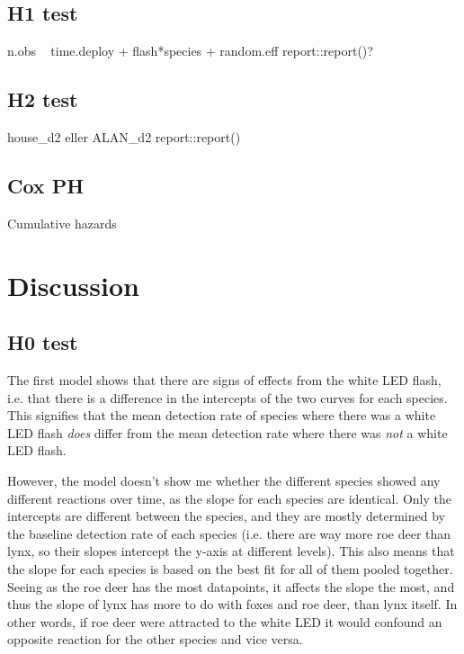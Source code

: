 \subsection{H1 test}
n.obs ~ time.deploy + flash*species + random.eff
report::report()?


\subsection{H2 test}
house_d2 eller ALAN_d2
report::report()




\subsection{Cox PH}
Cumulative hazards




\section{Discussion}
\subsection{H0 test}

The first model shows that there are signs of effects from the white LED flash, i.e. that there is a difference in the intercepts of the two curves for each species.
This signifies that the mean detection rate of species where there was a white LED flash \emph{does} differ from the mean detection rate where there was \emph{not} a white LED flash.

However, the model doesn't show me whether the different species showed any different reactions over time, as the slope for each species are identical. Only the intercepts are different between the species, and they are mostly determined by the baseline detection rate of each species (i.e. there are way more roe deer than lynx, so their slopes intercept the y-axis at different levels).
This also means that the slope for each species is based on the best fit for all of them pooled together.
Seeing as the roe deer has the most datapoints, it affects the slope the most, and thus the slope of lynx has more to do with foxes and roe deer, than lynx itself.  
In other words, if roe deer were attracted to the white LED it would confound an opposite reaction for the other species and vice versa.

